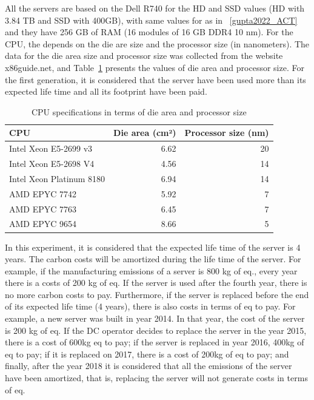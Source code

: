 All the servers are based on the Dell R740 for the HD and SSD values (HD with 3.84 TB and SSD with 400GB), with same values for  as in ~\ref{gupta2022_ACT} and they have 256 GB of RAM (16 modules of 16 GB DDR4 10 nm). For the CPU, the  depends on the die are size and the processor size (in nanometers). The data for the die area size and processor size was collected from the website x86guide.net, and Table~\ref{tab:cpu_specs} presents the values of die area and processor size. For the first generation, it is considered that the server have been used more than its expected life time and all its  footprint have been paid.

\begin{table}[H]
  \small
  \caption{CPU specifications in terms of die area and processor size} \centering
  \label{tab:cpu_specs} 
  \begin{tabular}{|l|r|r|}
   \hline
    
  \textbf{CPU}  & \textbf{Die area (cm²)} & \textbf{Processor size (nm)} \\
  \hline
    Intel Xeon E5-2699 v3& 6.62  & 20  \\
  \hline
    Intel Xeon E5-2698 V4 & 4.56 & 14\\
  \hline
    Intel Xeon Platinum 8180 & 6.94 & 14\\
  \hline
    AMD EPYC 7742  & 5.92 & 7 \\
  \hline
    AMD EPYC 7763 & 6.45   & 7 \\
  \hline
    AMD EPYC 9654 & 8.66 & 5 \\
  \hline
\end{tabular}  
\end{table}

In this experiment, it is considered that the expected life time of the server is 4 years. The carbon costs will be amortized during the life time of the server. For example, if the manufacturing emissions of a server is 800 kg of  eq., every year there is a costs of 200 kg of  eq. If the server is used after the fourth year, there is no more carbon costs to pay. Furthermore, if the server is replaced before the end of its expected life time (4 years), there is also costs in terms of   eq to pay. For example, a new server was built in year 2014. In that year, the cost of the server is 200 kg of  eq. If the DC operator decides to replace the server in the year 2015, there is a cost of 600kg  eq to pay; if the server is replaced in year 2016, 400kg of  eq to pay; if it is replaced on 2017, there is a cost of 200kg of  eq to pay; and finally, after the year 2018 it is considered that all the emissions of the server have been amortized, that is, replacing the server will not generate costs in terms of  eq.

